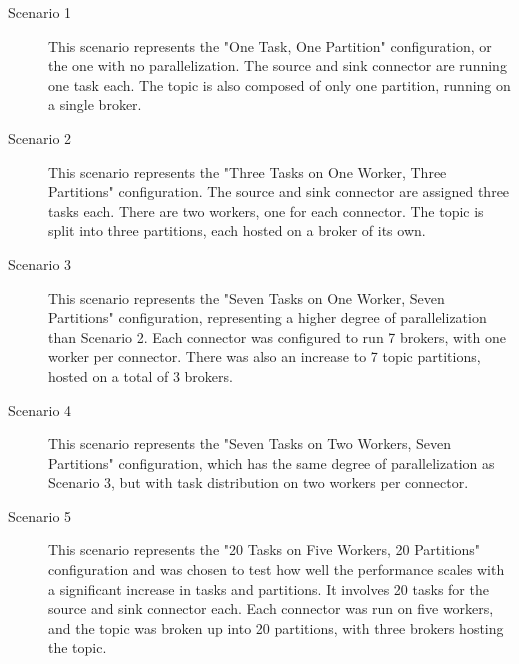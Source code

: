 \begin{description}
    \item [Scenario 1]
    This scenario represents the "One Task, One Partition" configuration, or the one with no parallelization. The source and sink connector are running one task each. The topic is also composed of only one partition, running on a single broker.

    \item[Scenario 2]
    This scenario represents the "Three Tasks on One Worker, Three Partitions" configuration. The source and sink connector are assigned three tasks each. There are two workers, one for each connector. The topic is split into three partitions, each hosted on a broker of its own.

    \item[Scenario 3]
    This scenario represents the "Seven Tasks on One Worker, Seven Partitions" configuration, representing a higher degree of parallelization than Scenario 2. Each connector was configured to run 7 brokers, with one worker per connector. There was also an increase to 7 topic partitions, hosted on a total of 3 brokers.

    \item[Scenario 4]
    This scenario represents the "Seven Tasks on Two Workers, Seven Partitions" configuration, which has the same degree of parallelization as Scenario 3, but with task distribution on two workers per connector.
    
    \item[Scenario 5]
    This scenario represents the "20 Tasks on Five Workers, 20 Partitions" configuration and was chosen to test how well the performance scales with a significant increase in tasks and partitions. It involves 20 tasks for the source and sink connector each. Each connector was run on five workers, and the topic was broken up into 20 partitions, with three brokers hosting the topic.
\end{description}

